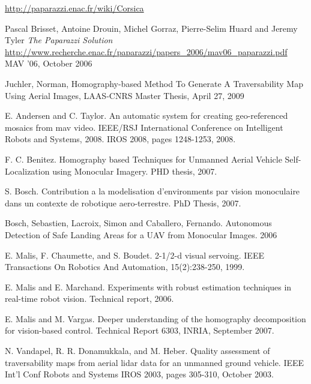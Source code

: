 \documentclass[a4paper,11pt]{report}
\begin{document}
\begin{thebibliography}{9}
  \url{http://paparazzi.enac.fr/wiki/Corsica}

  Pascal Brisset, Antoine Drouin, Michel Gorraz, Pierre-Selim Huard and Jeremy Tyler
  \emph{The Paparazzi Solution}
  \url{http://www.recherche.enac.fr/paparazzi/papers_2006/mav06_paparazzi.pdf}
  MAV '06,
  October 2006

Juchler, Norman, Homography-based Method To Generate A Traversability Map Using Aerial Images, LAAS-CNRS Master Thesis, April 27, 2009

E. Andersen and C. Taylor. An automatic system for creating geo-referenced mosaics from mav video.  IEEE/RSJ International Conference on Intelligent Robots and Systems, 2008. IROS 2008, pages 1248-1253, 2008.

F. C. Benitez. Homography based Techniques for Unmanned Aerial Vehicle Self-Localization using Monocular Imagery. PHD thesis, 2007.

S. Bosch. Contribution a la modelisation d'environments par vision monoculaire dans un contexte de robotique aero-terrestre. PhD Thesis, 2007.

Bosch, Sebastien, Lacroix, Simon and Caballero, Fernando. Autonomous Detection of Safe Landing Areas for a UAV from Monocular Images. 2006

E. Malis, F. Chaumette, and S. Boudet. 2-1/2-d visual servoing. IEEE Transactions On Robotics And Automation, 15(2):238-250, 1999.

E. Malis and E. Marchand. Experiments with robust estimation techniques in real-time robot vision. Technical report, 2006.

E. Malis and M. Vargas. Deeper understanding of the homography decomposition for vision-based control. Technical Report 6303, INRIA, September 2007.

N. Vandapel, R. R. Donamukkala, and M. Heber. Quality assessment of traversability maps from aerial lidar data for an unmanned ground vehicle. IEEE Int'l Conf Robots and Systems IROS 2003, pages 305-310, October 2003.

\end{thebibliography}
\end{document}
